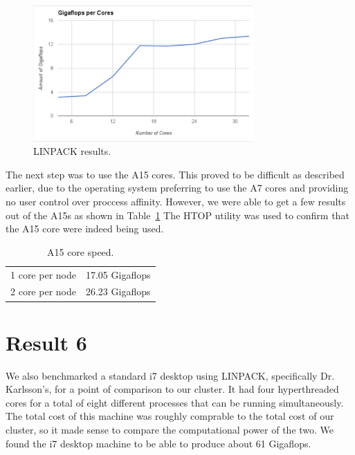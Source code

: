 \begin{figure}[tbh]
\begin{center}
\includegraphics[width=0.75\textwidth]{minimalgraph.JPG}
\end{center}
\caption{LINPACK results. \label{linpackresults}}
\end{figure}

The next step was to use the A15 cores. This proved to be difficult as described earlier, due to the operating system preferring to use the A7 cores and providing no user control over proccess affinity. However, we were able to get a few results out of the A15s as shown in Table~\ref{a15} The HTOP utility was used to confirm that the A15 core were indeed being used. 

\begin{table}[tbh]
\caption{A15 core speed. \label{a15}}
\begin{center}
\begin{tabular}{|r|l|}
  \hline
  1 core per node &  17.05 Gigaflops \\
  2 core per node &  26.23 Gigaflops \\ 
  \hline
\end{tabular}
\end{center}
\end{table}

\section{Result 6}

We also benchmarked a standard i7 desktop using LINPACK, specifically Dr. Karlsson's, for a point of comparison to our cluster. It had four hyperthreaded cores for a total of eight different processes that can be running simultaneously. The total cost of this machine was roughly comprable to the total cost of our cluster, so it made sense to compare the computational power of the two. We found the i7 desktop machine to be able to produce about 61 Gigaflops. 

